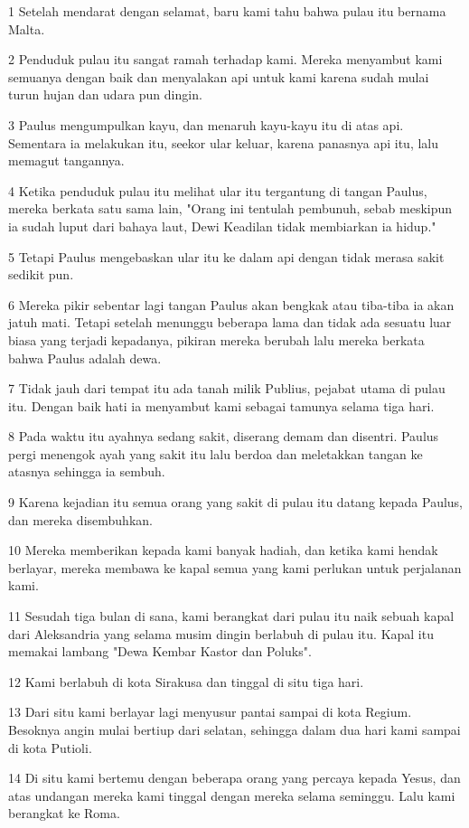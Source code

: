 \par 1 Setelah mendarat dengan selamat, baru kami tahu bahwa pulau itu bernama Malta.
\par 2 Penduduk pulau itu sangat ramah terhadap kami. Mereka menyambut kami semuanya dengan baik dan menyalakan api untuk kami karena sudah mulai turun hujan dan udara pun dingin.
\par 3 Paulus mengumpulkan kayu, dan menaruh kayu-kayu itu di atas api. Sementara ia melakukan itu, seekor ular keluar, karena panasnya api itu, lalu memagut tangannya.
\par 4 Ketika penduduk pulau itu melihat ular itu tergantung di tangan Paulus, mereka berkata satu sama lain, "Orang ini tentulah pembunuh, sebab meskipun ia sudah luput dari bahaya laut, Dewi Keadilan tidak membiarkan ia hidup."
\par 5 Tetapi Paulus mengebaskan ular itu ke dalam api dengan tidak merasa sakit sedikit pun.
\par 6 Mereka pikir sebentar lagi tangan Paulus akan bengkak atau tiba-tiba ia akan jatuh mati. Tetapi setelah menunggu beberapa lama dan tidak ada sesuatu luar biasa yang terjadi kepadanya, pikiran mereka berubah lalu mereka berkata bahwa Paulus adalah dewa.
\par 7 Tidak jauh dari tempat itu ada tanah milik Publius, pejabat utama di pulau itu. Dengan baik hati ia menyambut kami sebagai tamunya selama tiga hari.
\par 8 Pada waktu itu ayahnya sedang sakit, diserang demam dan disentri. Paulus pergi menengok ayah yang sakit itu lalu berdoa dan meletakkan tangan ke atasnya sehingga ia sembuh.
\par 9 Karena kejadian itu semua orang yang sakit di pulau itu datang kepada Paulus, dan mereka disembuhkan.
\par 10 Mereka memberikan kepada kami banyak hadiah, dan ketika kami hendak berlayar, mereka membawa ke kapal semua yang kami perlukan untuk perjalanan kami.
\par 11 Sesudah tiga bulan di sana, kami berangkat dari pulau itu naik sebuah kapal dari Aleksandria yang selama musim dingin berlabuh di pulau itu. Kapal itu memakai lambang "Dewa Kembar Kastor dan Poluks".
\par 12 Kami berlabuh di kota Sirakusa dan tinggal di situ tiga hari.
\par 13 Dari situ kami berlayar lagi menyusur pantai sampai di kota Regium. Besoknya angin mulai bertiup dari selatan, sehingga dalam dua hari kami sampai di kota Putioli.
\par 14 Di situ kami bertemu dengan beberapa orang yang percaya kepada Yesus, dan atas undangan mereka kami tinggal dengan mereka selama seminggu. Lalu kami berangkat ke Roma.
